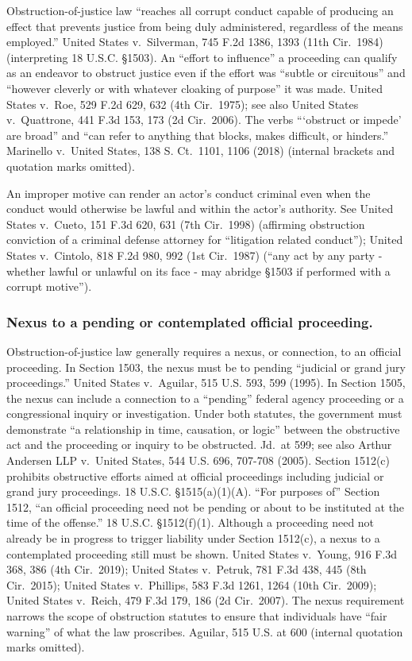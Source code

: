 Obstruction-of-justice law “reaches all corrupt conduct capable of producing an effect that prevents justice from being duly administered, regardless of the means employed.”
United States v.\ Silverman, 745 F.2d 1386, 1393 (11th Cir.~1984) (interpreting 18 U.S.C. \S 1503).
An “effort to influence” a proceeding can qualify as an endeavor to obstruct justice even if the effort was “subtle or circuitous” and “however cleverly or with whatever cloaking of purpose” it was made.
United States v.\ Roe, 529 F.2d 629, 632 (4th Cir.~1975);
see also United States v.\ Quattrone, 441 F.3d 153, 173 (2d Cir.~2006).
The verbs “‘obstruct or impede’ are broad” and “can refer to anything that blocks, makes difficult, or hinders.”
Marinello v.\ United States, 138 S. Ct.~1101, 1106 (2018) (internal brackets and quotation marks omitted).

An improper motive can render an actor’s conduct criminal even when the conduct would otherwise be lawful and within the actor’s authority.
See United States v.\ Cueto, 151 F.3d 620, 631 (7th Cir.~1998) (affirming obstruction conviction of a criminal defense attorney for “litigation related conduct”); United States v.\ Cintolo, 818 F.2d 980, 992 (1st Cir.~1987) (“any act by any party - whether lawful or unlawful on its face - may abridge \S 1503 if performed with a corrupt motive”).

\subsubsection*{Nexus to a pending or contemplated official proceeding.}

Obstruction-of-justice law generally requires a nexus, or connection, to an official proceeding.
In Section 1503, the nexus must be to pending “judicial or grand jury proceedings.”
United States v.\ Aguilar, 515 U.S. 593, 599 (1995).
In Section 1505, the nexus can include a connection to a “pending” federal agency proceeding or a congressional inquiry or investigation.
Under both statutes, the government must demonstrate “a relationship in time, causation, or logic” between the obstructive act and the proceeding or inquiry to be obstructed.
Jd.\ at 599; see also Arthur Andersen LLP v.\ United States, 544 U.S. 696, 707-708 (2005).
Section 1512(c) prohibits obstructive efforts aimed at official proceedings including judicial or grand jury proceedings.
18 U.S.C. \S 1515(a)(1)(A).
“For purposes of” Section 1512, “an official proceeding need not be pending or about to be instituted at the time of the offense.”
18 U.S.C. \S 1512(f)(1).
Although a proceeding need not already be in progress to trigger liability under Section 1512(c), a nexus to a contemplated proceeding still must be shown.
United States v.\ Young, 916 F.3d 368, 386 (4th Cir.~2019);
United States v.\ Petruk, 781 F.3d 438, 445 (8th Cir.~2015);
United States v.\ Phillips, 583 F.3d 1261, 1264 (10th Cir.~2009);
United States v.\ Reich, 479 F.3d 179, 186 (2d Cir.~2007).
The nexus requirement narrows the scope of obstruction statutes to ensure that individuals have “fair warning” of what the law proscribes.
Aguilar, 515 U.S. at 600 (internal quotation marks omitted).

